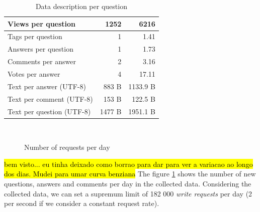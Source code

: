 \begin{table}[ht]
\begin{minipage}[b]{0.45\linewidth}
\begin{tabular}{|l|r|r|}
          Views per question          & 1252             & 6216                    \\ \hline
          Tags per question           & 1                & 1.41                    \\ \hline
          Answers per question        & 1                & 1.73                    \\ \hline
          Comments per answer         & 2                & 3.16                    \\ \hline
          Votes per answer            & 4                & 17.11                   \\ \hline
          Text per answer (UTF-8)     & 883 B        & 1133.9 B            \\ \hline
          Text per comment (UTF-8)    & 153 B       & 122.5 B           \\ \hline
          Text per question (UTF-8)   & 1477 B       & 1951.1 B            \\ \hline
      \end{tabular}
    \caption{Data description per question}
    \label{tab:totalPerTopic}
\end{minipage}
\end{table}


\begin{figure}[!htb]
  \centering
   \quad
   \\
   \quad
   \quad
  \caption{Number of requests per day}
  \label{fig:stackNetworkRequestRate}
\end{figure} 

\hl{bem visto... eu tinha deixado como borrao para dar para ver a variacao ao longo dos dias. Mudei para umar curva benziana}
The figure \ref{fig:stackNetworkRequestRate} shows the number of new questions, answers and comments per day in the collected data. Considering the collected data, we can set a supremum limit of 182 000 \emph{write requests} per day (2 per second if we consider a constant request rate). 

